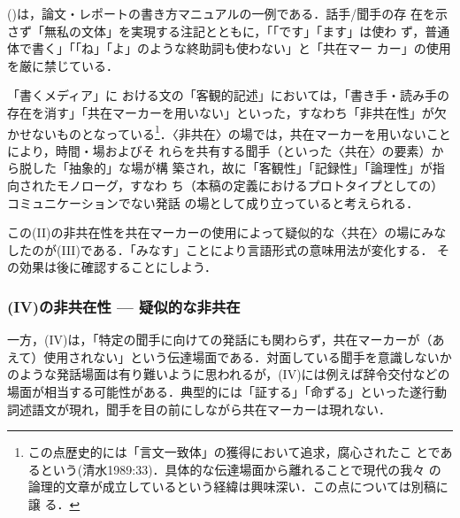 \documentclass[japanese]{jnlp_1.3c}
\begin{document}
()は，論文・レポートの書き方マニュアルの一例である．話手/聞手の存
在を示さず「無私の文体」を実現する注記とともに，「「です」「ます」は使わ
ず，普通体で書く」「「ね」「よ」のような終助詞も使わない」と「共在マー
カー」の使用を厳に禁じている．


「書くメディア」に
おける文の「客観的記述」においては，「書き手・読み手の
存在を消す」「共在マーカーを用いない」といった，すなわち「非共在性」が欠
かせないものとなっている\footnote{
	この点歴史的には「言文一致体」の獲得において追求，腐心されたこ
	とであるという(清水1989:33)．具体的な伝達場面から離れることで現代の我々
	の論理的文章が成立しているという経緯は興味深い．この点については別稿に譲
	る．}．〈非共在〉の場では，共在マーカーを用いないことにより，時間・場およびそ
れらを共有する聞手（といった〈共在〉の要素）から脱した「抽象的」な場が構
築され，故に「客観性」「記録性」「論理性」が指向されたモノローグ，すなわ
ち（本稿の定義におけるプロトタイプとしての）コミュニケーションでない発話
の場として成り立っていると考えられる．

この(II)の非共在性を共在マーカーの使用によって疑似的な〈共在〉の場にみな
したのが(III)である．「みなす」ことにより言語形式の意味用法が変化する．
その効果は後に確認することにしよう．

\subsubsection{(IV)の非共在性 --- 疑似的な非共在}

一方，(IV)は，「特定の聞手に向けての発話にも関わらず，共在マーカーが（あ
えて）使用されない」という伝達場面である．対面している聞手を意識しないか
のような発話場面は有り難いように思われるが，(IV)には例えば辞令交付などの
場面が相当する可能性がある．典型的には「証する」「命ずる」といった遂行動
詞述語文が現れ，聞手を目の前にしながら共在マーカーは現れない．
\end{document}

